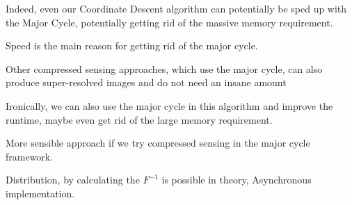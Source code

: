 Indeed, even our Coordinate Descent algorithm can potentially be sped up with the Major Cycle, potentially getting rid of the massive memory requirement.




Speed is the main reason for getting rid of the major cycle. 

Other compressed sensing approaches, which use the major cycle, can also produce super-resolved images and do not need an insane amount

Ironically, we can also use the major cycle in this algorithm and improve the runtime, maybe even get rid of the large memory requirement.

More sensible approach if we try compressed sensing in the major cycle framework.

Distribution, by calculating the $F^{-1}$ is possible in theory,  Asynchronous implementation. 







 
